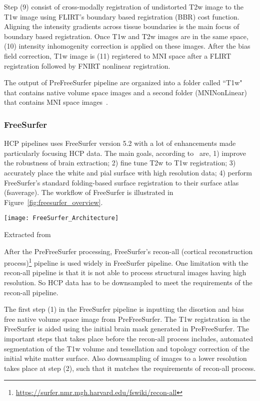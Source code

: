 Step (9) consist of cross-modally registration of undistorted T2w image to the T1w image using FLIRT's boundary based registration (BBR) cost function. Aligning the intensity gradients across tissue boundaries is the main focus of boundary based registration. Once T1w and T2w images are in the same space, (10) intensity inhomogenity correction is applied on these images. After the bias field correction, T1w image is (11) registered to MNI space after a FLIRT registration followed by FNIRT nonlinear registration.

The output of PreFreeSurfer pipeline are organized into a folder called ``T1w" that contains native volume space images and a second folder (MNINonLinear) that contains MNI space images~\cite{Gla13}.

\subsubsection{FreeSurfer}
HCP pipelines uses FreeSurfer version 5.2 with a lot of enhancements made particularly focusing HCP data. The main goals, according to~\cite{Gla13} are, 1) improve the robustness of brain extraction; 2) fine tune T2w to T1w registration; 3) accurately place the white and pial surface with high resolution data; 4) perform FreeSurfer's standard folding-based surface registration to their surface atlas (fsaverage). The workflow of FreeSurfer is illustrated in Figure~\ref{fig:freesurfer_overview}.

\begin{center}
  \texttt{[image: FreeSurfer\_Architecture]}
  \label{fig:freesurfer_overview}
  \caption*{Extracted from \cite{Gla13}}
\end{center}

After the PreFreeSurfer processing, FreeSurfer's recon-all (cortical reconstruction process)\footnote{\url{https://surfer.nmr.mgh.harvard.edu/fswiki/recon-all}} pipeline is used widely in FreeSurfer pipeline. One limitation with the recon-all pipeline is that it is not able to process structural images having high resolution. So HCP data has to be downsampled to meet the requirements of the recon-all pipeline.

The first step (1) in the FreeSurfer pipeline is inputting the disortion and bias free native volume space image from PreFreeSurfer. The T1w registration in the FreeSurfer is aided using the initial brain mask generated in PreFreeSurfer. The important steps that takes place before the recon-all process includes, automated segmentation of the T1w volume and tessellation and topology correction of the initial white matter surface. Also downsampling of images to a lower resolution takes place at step (2), such that it matches the requirements of recon-all process.

